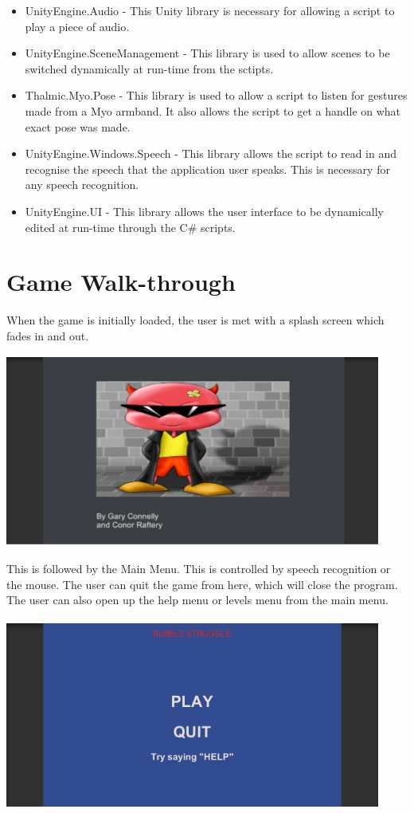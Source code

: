 \documentclass{article}
\begin{document}
\begin{itemize}
    \item UnityEngine.Audio - This Unity library is necessary for allowing a script to play a piece of audio.
    \item UnityEngine.SceneManagement - This library is used to allow scenes to be switched dynamically at run-time from the sctipts.
    \item Thalmic.Myo.Pose - This library is used to allow a script to listen for gestures made from a Myo armband. It also allows the script to get a handle on what exact pose was made. 
    \item UnityEngine.Windows.Speech - This library allows the script to read in and recognise the speech that the application user speaks. This is necessary for any speech recognition. 
    \item UnityEngine.UI - This library allows the user interface to be dynamically edited at run-time through the C\# scripts.
\end{itemize}
\section{Game Walk-through}

When the game is initially loaded, the user is met with a splash screen which fades in and out. 

\bigskip
\includegraphics[width=350pt, height=180pt]{img/splashscreen.PNG}
\bigskip

This is followed by the Main Menu. This is controlled by speech recognition or the mouse. The user can quit the game from here, which will close the program. The user can also open up the help menu or levels menu from the main menu.

\bigskip
\includegraphics[width=350pt, height=180pt]{img/mainmenu.PNG}
\bigskip
\end{document}
